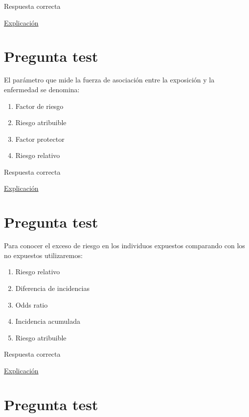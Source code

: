 \documentclass[
]{book}
\providecommand{\tightlist}{%
  \setlength{\itemsep}{0pt}\setlength{\parskip}{0pt}}
\begin{document}
Respuesta correcta

\href{https://1fjmanzano.github.io/bioestadistica/relaci\%C3\%B3n-entre-variables-cualitativas.html\#diagno\%CC\%81stico-cli\%CC\%81nico}{Explicación}

\hypertarget{pregunta-test-93}{%
\section{Pregunta test}\label{pregunta-test-93}}

El parámetro que mide la fuerza de asociación entre la exposición y la enfermedad se denomina:

\begin{enumerate}
\def\labelenumi{\alph{enumi})}
\tightlist
\item
  Factor de riesgo
\item
  Riesgo atribuible
\item
  Factor protector
\item
  Riesgo relativo
\end{enumerate}

Respuesta correcta

\href{https://es.wikipedia.org/wiki/Riesgo_relativo}{Explicación}

\hypertarget{pregunta-test-94}{%
\section{Pregunta test}\label{pregunta-test-94}}

Para conocer el exceso de riesgo en los individuos expuestos comparando con los no expuestos utilizaremos:

\begin{enumerate}
\def\labelenumi{\alph{enumi})}
\tightlist
\item
  Riesgo relativo
\item
  Diferencia de incidencias
\item
  Odds ratio
\item
  Incidencia acumulada
\item
  Riesgo atribuible
\end{enumerate}

Respuesta correcta

\href{https://es.wikipedia.org/wiki/Riesgo_atribuible}{Explicación}

\hypertarget{pregunta-test-95}{%
\section{Pregunta test}\label{pregunta-test-95}}
\end{document}
